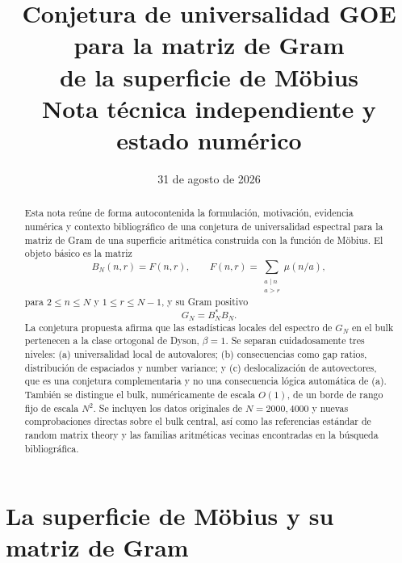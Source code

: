 \documentclass[11pt,a4paper]{article}
\title{Conjetura de universalidad GOE para la matriz de Gram\\de la superficie de Möbius\\\large Nota técnica independiente y estado numérico}
\author{}
\date{31 de agosto de 2026}
\begin{document}
\maketitle

\begin{abstract}
Esta nota reúne de forma autocontenida la formulación, motivación, evidencia numérica y contexto bibliográfico de una conjetura de universalidad espectral para la matriz de Gram de una superficie aritmética construida con la función de Möbius. El objeto básico es la matriz
\[
B_N(n,r)=F(n,r),\qquad
F(n,r)=\sum_{\substack{a\mid n\\a>r}}\mu(n/a),
\]
para $2\le n\le N$ y $1\le r\le N-1$, y su Gram positivo
\[
G_N=B_N^*B_N.
\]
La conjetura propuesta afirma que las estadísticas locales del espectro de $G_N$ en el bulk pertenecen a la clase ortogonal de Dyson, $\beta=1$. Se separan cuidadosamente tres niveles: (a) universalidad local de autovalores; (b) consecuencias como gap ratios, distribución de espaciados y number variance; y (c) deslocalización de autovectores, que es una conjetura complementaria y no una consecuencia lógica automática de (a). También se distingue el bulk, numéricamente de escala $O(1)$, de un borde de rango fijo de escala $N^2$. Se incluyen los datos originales de $N=2000,4000$ y nuevas comprobaciones directas sobre el bulk central, así como las referencias estándar de random matrix theory y las familias aritméticas vecinas encontradas en la búsqueda bibliográfica.
\end{abstract}

\tableofcontents

\section{La superficie de Möbius y su matriz de Gram}
\end{document}
